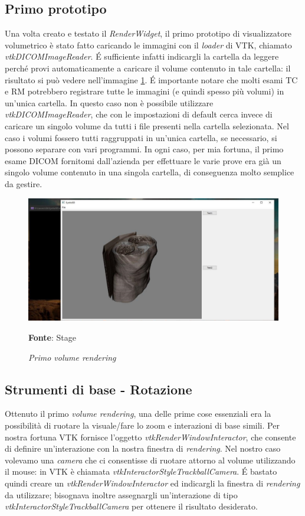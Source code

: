 \subsection{Primo prototipo}
Una volta creato e testato il \emph{RenderWidget}, il primo prototipo di visualizzatore volumetrico è stato fatto caricando le immagini con il \emph{loader} di VTK, chiamato \emph{vtkDICOMImageReader}. \'E sufficiente infatti indicargli la cartella da leggere perché provi automaticamente a caricare il volume contenuto in tale cartella: il risultato si può vedere nell'immagine \ref{fig: firstvolume}. \'E importante notare che molti esami TC e RM potrebbero registrare tutte le immagini (e quindi spesso più volumi) in un'unica cartella. In questo caso non è possibile utilizzare \emph{vtkDICOMImageReader}, che con le impostazioni di default cerca invece di caricare un singolo volume da tutti i file presenti nella cartella selezionata. Nel caso i volumi fossero tutti raggruppati in un'unica cartella, se necessario, si possono separare con vari programmi. In ogni caso, per mia fortuna, il primo esame DICOM fornitomi dall'azienda per effettuare le varie prove era già un singolo volume contenuto in una singola cartella, di conseguenza molto semplice da gestire.

\begin{figure}[h]
    \centering
    \includegraphics[width=1\textwidth]{immagini/svolgimento/firstvolume.jpg}
    \caption{\textit{Primo volume rendering}}
    \textbf{Fonte}: Stage
    \label{fig: firstvolume}
\end{figure}

\subsection{Strumenti di base - Rotazione}
Ottenuto il primo \emph{volume rendering}, una delle prime cose essenziali era la possibilità di ruotare la visuale/fare lo zoom e interazioni di base simili. Per nostra fortuna VTK fornisce l'oggetto \emph{vtkRenderWindowInteractor}, che consente di definire un'interazione con la nostra finestra di \emph{rendering}. Nel nostro caso volevamo una \emph{camera} che ci consentisse di ruotare attorno al volume utilizzando il mouse: in VTK è chiamata \emph{vtkInteractorStyleTrackballCamera}. \'E bastato quindi creare un \emph{vtkRenderWindowInteractor} ed indicargli la finestra di \emph{rendering} da utilizzare; bisognava inoltre assegnargli un'interazione di tipo \emph{vtkInteractorStyleTrackballCamera} per ottenere il risultato desiderato.

